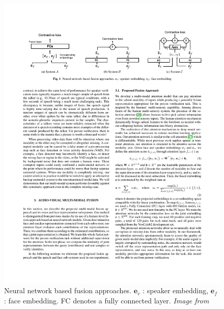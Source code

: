 \begin{figure}[!ht]
\centering
\includegraphics[scale=0.85]{figures/noise-tolerant}
\caption[Noise-tolerant fusion model]{Neural network based fusion approaches. $\mathbf{e}_v$ : speaker embedding, $\mathbf{e}_f$ : face embedding. FC denotes a fully connected layer. \textit{Image from} \citep{audiovisual-attention}}
\label{fig:noise-tolerant}
\end{figure}



